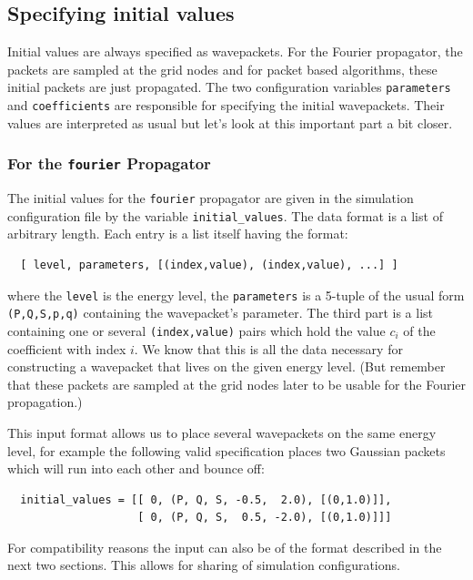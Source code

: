 \documentclass[a4paper,10pt]{report}
\begin{document}
\subsection{Specifying initial values}

Initial values are always specified as wavepackets. For the Fourier propagator,
the packets are sampled at the grid nodes and for packet based algorithms, these
initial packets are just propagated. The two configuration variables \texttt{parameters}
and \texttt{coefficients} are responsible for specifying the initial wavepackets.
Their values are interpreted as usual but let's look at this important part
a bit closer.

\subsubsection{For the \texttt{fourier} Propagator}

The initial values for the \texttt{fourier} propagator are given in the simulation
configuration file by the variable \texttt{initial\_values}. The data format is
a list of arbitrary length. Each entry is a list itself having the format:

\begin{verbatim}
  [ level, parameters, [(index,value), (index,value), ...] ]
\end{verbatim}

where the \texttt{level} is the energy level, the \texttt{parameters} is a 5-tuple
of the usual form \texttt{(P,Q,S,p,q)} containing the wavepacket's parameter. The
third part is a list containing one or several \texttt{(index,value)} pairs
which hold the value $c_i$ of the coefficient with index $i$. We know that
this is all the data necessary for constructing a wavepacket that lives on
the given energy level. (But remember that these packets are sampled at the grid
nodes later to be usable for the Fourier propagation.)

This input format allows us to place several wavepackets on the same energy level,
for example the following valid specification places two Gaussian packets
which will run into each other and bounce off:

\begin{verbatim}
  initial_values = [[ 0, (P, Q, S, -0.5,  2.0), [(0,1.0)]],
                    [ 0, (P, Q, S,  0.5, -2.0), [(0,1.0)]]]
\end{verbatim}

For compatibility reasons the input can also be of the format described
in the next two sections. This allows for sharing of simulation configurations.
\end{document}
